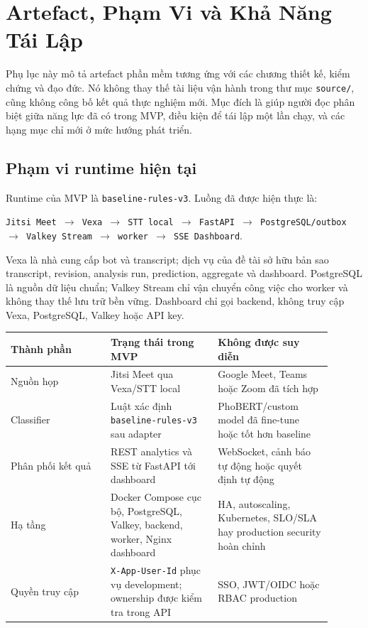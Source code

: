 
\chapter{Artefact, Phạm Vi và Khả Năng Tái Lập}
\label{app:artefact}

Phụ lục này mô tả artefact phần mềm tương ứng với các chương thiết kế, kiểm chứng và đạo đức. Nó không thay thế tài liệu vận hành trong thư mục \texttt{source/}, cũng không công bố kết quả thực nghiệm mới. Mục đích là giúp người đọc phân biệt giữa năng lực đã có trong MVP, điều kiện để tái lập một lần chạy, và các hạng mục chỉ mới ở mức hướng phát triển.

\section{Phạm vi runtime hiện tại}
Runtime của MVP là \texttt{baseline-rules-v3}. Luồng đã được hiện thực là:

\begin{center}
\texttt{Jitsi Meet $\rightarrow$ Vexa $\rightarrow$ STT local $\rightarrow$ FastAPI $\rightarrow$ PostgreSQL/outbox $\rightarrow$ Valkey Stream $\rightarrow$ worker $\rightarrow$ SSE Dashboard}.
\end{center}

Vexa là nhà cung cấp bot và transcript; dịch vụ của đề tài sở hữu bản sao transcript, revision, analysis run, prediction, aggregate và dashboard. PostgreSQL là nguồn dữ liệu chuẩn; Valkey Stream chỉ vận chuyển công việc cho worker và không thay thế lưu trữ bền vững. Dashboard chỉ gọi backend, không truy cập Vexa, PostgreSQL, Valkey hoặc API key.

\begin{longtable}{p{0.28\linewidth}p{0.30\linewidth}p{0.32\linewidth}}
\toprule
\textbf{Thành phần} & \textbf{Trạng thái trong MVP} & \textbf{Không được suy diễn} \\
\midrule
\endhead
\bottomrule
\endfoot
Nguồn họp & Jitsi Meet qua Vexa/STT local & Google Meet, Teams hoặc Zoom đã tích hợp \\
Classifier & Luật xác định \texttt{baseline-rules-v3} sau adapter & PhoBERT/custom model đã fine-tune hoặc tốt hơn baseline \\
Phân phối kết quả & REST analytics và SSE từ FastAPI tới dashboard & WebSocket, cảnh báo tự động hoặc quyết định tự động \\
Hạ tầng & Docker Compose cục bộ, PostgreSQL, Valkey, backend, worker, Nginx dashboard & HA, autoscaling, Kubernetes, SLO/SLA hay production security hoàn chỉnh \\
Quyền truy cập & \texttt{X-App-User-Id} phục vụ development; ownership được kiểm tra trong API & SSO, JWT/OIDC hoặc RBAC production \\
\end{longtable}

